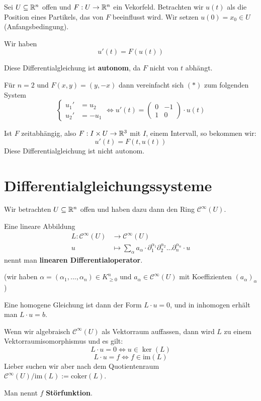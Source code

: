 \documentclass[main.tex]{subfiles}
\begin{document}
\begin{Beispiel}
  Sei $U \subseteq \mathbb{R}^n$ offen und $F: U \to \mathbb{R}^n$ ein Vekorfeld. Betrachten wir $u(t)$ als die Position eines Partikels, das von $F$ beeinflusst wird. Wir setzen $u(0) = x_0 \in U$ (Anfangsbedingung).

  Wir haben
  \begin{equation*}
    u'(t) = F(u(t)) \tag{*}
  \end{equation*}

  Diese Differentialgleichung ist \textbf{autonom}, da $F$ nicht von $t$ abhängt.

  Für $n = 2$ und $F(x,y) = (y,-x)$ dann vereinfacht sich $(*)$ zum folgenden System
  $$\left\{\begin{aligned}
    u_1' & = u_2 \\ u_2' & = -u_1
  \end{aligned}\right. \Leftrightarrow u'(t) = \begin{pmatrix}
    0 & -1 \\ 1 & 0
  \end{pmatrix} \cdot u(t)$$

  Ist $F$ zeitabhängig, also $F: I \times U \to \mathbb{R}^3$ mit $I$, einem Intervall, so bekommen wir:
  $$u'(t) = F(t,u(t))$$
  Diese Differentialgleichung ist nicht autonom.
\end{Beispiel}


\section{Differentialgleichungssysteme}

Wir betrachten $U \subseteq \mathbb{R}^n$ offen und haben dazu dann den Ring $\mathcal{C}^\infty(U)$.

\begin{Definition}
  Eine lineare Abbildung
  $$\begin{aligned}
    L : \mathcal{C}^\infty(U) & \to \mathcal{C}^\infty(U) \\
    u & \mapsto \sum \limits_\alpha a_\alpha \cdot \partial_1^{\alpha_1} \partial_2^{\alpha_2} ... \partial_n^{\alpha_n} \cdot u
  \end{aligned}$$
  nennt man \textbf{linearen Differentialoperator}.

  (wir haben $\alpha = (\alpha_1,...,\alpha_n) \in K_{\geq 0}^n$ und $a_\alpha \in \mathcal{C}^\infty(U)$ mit Koeffizienten $(a_\alpha)_\alpha$)

  Eine homogene Gleichung ist dann der Form $L \cdot u = 0$, und in inhomogen erhält man $L \cdot u = b$.
  \begin{Bemerkung}
    Wenn wir algebraisch $\mathcal{C}^\infty(U)$ als Vektorraum auffassen, dann wird $L$ zu einem Vektorraumisomorphismus und es gilt:
    $$L \cdot u = 0 \Leftrightarrow u \in \ker(L)$$
    $$L \cdot u = f \Leftrightarrow f \in \text{im}(L)$$
    Lieber suchen wir aber nach dem Quotientenraum $\mathcal{C}^\infty(U) / \text{im}(L) := \text{coker}(L)$.
  \end{Bemerkung}

  Man nennt $f$ \textbf{Störfunktion}.
\end{Definition}
\end{document}
